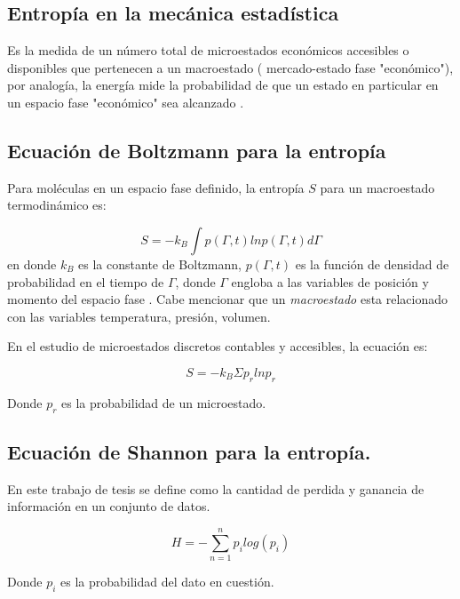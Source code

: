 \subsection{Entropía en la mecánica estadística} 


Es la medida de un número total de microestados económicos accesibles o disponibles que pertenecen a un macroestado ( mercado-estado fase "económico"), por analogía, la energía mide la probabilidad de que un estado en particular en un espacio fase "económico" sea alcanzado \citep{richmond}.

\subsection{Ecuación de Boltzmann para la entropía}

Para moléculas en un espacio fase definido, la entropía $S$ para un macroestado termodinámico es:

\begin{equation}
	S = -k_B \int p(\Gamma,t) ln p(\Gamma,t) d\Gamma
\end{equation}
 en donde $k_B$ es la constante de Boltzmann, $ p(\Gamma,t)$ es la función de densidad de probabilidad en el tiempo de $\Gamma$, donde $\Gamma$ engloba a las variables de posición y momento del espacio fase \citep[][pagina 13]{richmond}. Cabe mencionar que un \textit{macroestado} esta relacionado con las variables temperatura, presión, volumen.
 
 En el estudio de microestados discretos contables y accesibles, la ecuación es: 
 
 \begin{equation}
 	S = -k_B \Sigma p_r ln p_r
 \end{equation}  

Donde $p_r$ es la probabilidad de un microestado. 

\subsection{Ecuación de Shannon para la entropía.}

En este trabajo de tesis se define como la cantidad de perdida y ganancia de información en un conjunto de datos.

\begin{equation}
	H = - \sum_{n=1}^{n} p_i log(p_i)
\end{equation}

Donde $p_i$ es la probabilidad del dato en cuestión. 

